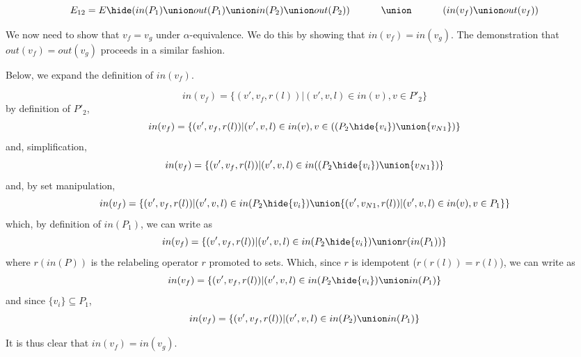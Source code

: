 \[
E_{12}  =  
   E\hide
  (
    in(P_1) \union out(P_1) \union in(P_2) \union out(P_2)
  ) \\
   \hphantom{E_{12}  = \;\;}   \union\ \\
\hphantom{E_{12}  = \;\;}   (in(v_f) \union out(v_f))\\ 
\]


We now need to show that $v_f=v_g$ under $\alpha$-equivalence. We do this by showing that $in(v_f)=in(v_g)$. The demonstration that $out(v_f)=out(v_g)$ proceeds in a similar fashion. 

Below, we expand the definition of $in(v_f)$. 

\[
in(v_f) = \{(v',v_f,r(l))|(v',v,l) \in in(v), v\in P'_2\}
\]
\noindent
by definition of $P'_2$,
\[
in(v_f) = \{(v',v_f,r(l))|(v',v,l) \in in(v), v\in((P_2\hide\{v_i\})\union\{v_{N1}\})\}
\]
\noindent
and,  simplification, 
\[
in(v_f) = \{(v',v_f,r(l))|(v',v,l) \in in((P_2\hide\{v_i\}) \union \{v_{N1}\})\}
\]
\noindent
and, by set manipulation, 
\[
in(v_f) = \{(v',v_f,r(l))|(v',v,l) \in in(P_2\hide\{v_i\}) \union  \{(v',v_{N1},r(l))|(v',v,l)\in in(v), v\in P_1\}\}
\]
\noindent
which, by definition of $in(P_1)$, we can write as
\[
in(v_f) = \{(v',v_f,r(l))|(v',v,l) \in in(P_2\hide\{v_i\}) \union  r(in(P_1))\}
\]
\noindent
where $r(in(P))$ is the relabeling operator $r$ promoted to sets.  Which, since $r$ is idempotent ($r(r(l)) = r(l)$), we can write as
\[
in(v_f) = \{(v',v_f,r(l))|(v',v,l) \in in(P_2\hide\{v_i\}) \union  in(P_1)\}
\]
\noindent
and since $\{v_i\} \subseteq P_1$, 
\[
in(v_f) = \{(v',v_f,r(l))|(v',v,l) \in in(P_2) \union  in(P_1)\}
\]



It is thus clear that $in(v_f)=in(v_g)$. 


\pagebreak

